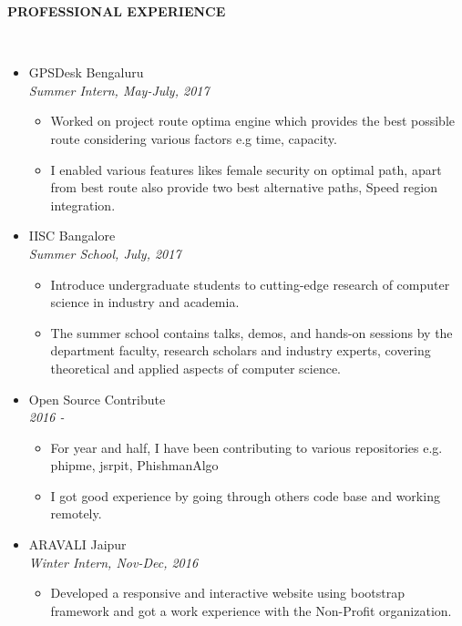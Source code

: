 \documentclass[a4paper,10pt]{article}
\newcommand{\isep}{-2 pt}
\newcommand{\lsep}{-0.5cm}
\newcommand{\resheading}[1]{{\small \colorbox{mygrey}{\begin{minipage}{0.975\textwidth}{\textbf{#1 \vphantom{p\^{E}}}}\end{minipage}}}}
\begin{document}
\resheading{\textbf{PROFESSIONAL EXPERIENCE} }\\[\lsep]
\begin{itemize}
\item \noindent GPSDesk Bengaluru \\
\emph{Summer Intern, May-July, 2017} \\[-0.6cm]
    \begin{itemize}\itemsep \isep
    	\item Worked on project route optima engine which provides the best possible route considering various factors e.g time, capacity. 
    	\item I enabled various features likes female security on optimal path, apart from best route also provide two best alternative paths, Speed region integration.

\end{itemize}

\item \noindent IISC Bangalore \\
\emph{Summer School, July, 2017} \\[-0.6cm]
    \begin{itemize}\itemsep \isep
    	\item Introduce undergraduate students to cutting-edge research of computer science in industry and academia.
    	\item The summer school contains talks, demos, and hands-on sessions by the department faculty, research scholars and industry experts, covering theoretical and applied aspects of computer science. 
    	
\end{itemize}

\item \noindent Open Source Contribute \\
\emph{2016 -} \\[-0.6cm]
    \begin{itemize}\itemsep \isep
    	\item For year and half, I have been contributing to various repositories e.g. phipme, jsrpit, PhishmanAlgo
    	\item I got good experience by going through others code base and working remotely.
\end{itemize}
\item \noindent ARAVALI Jaipur \\
\emph{Winter Intern, Nov-Dec, 2016} \\[-0.6cm]
    \begin{itemize}\itemsep \isep
    	\item Developed a responsive and interactive website using bootstrap framework and got a work experience with the Non-Profit organization.
\end{itemize}

\end{itemize}
\end{document}
